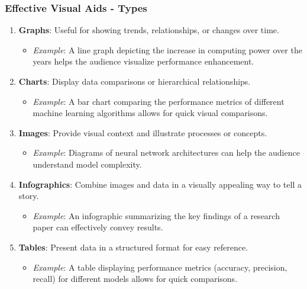 \documentclass[aspectratio=169]{beamer}
\begin{document}
\begin{frame}[fragile]
    \frametitle{Effective Visual Aids - Types}
    \begin{enumerate}
        \item \textbf{Graphs}: Useful for showing trends, relationships, or changes over time.
            \begin{itemize}
                \item \textit{Example}: A line graph depicting the increase in computing power over the years helps the audience visualize performance enhancement.
            \end{itemize}
        \item \textbf{Charts}: Display data comparisons or hierarchical relationships.
            \begin{itemize}
                \item \textit{Example}: A bar chart comparing the performance metrics of different machine learning algorithms allows for quick visual comparisons.
            \end{itemize}
        \item \textbf{Images}: Provide visual context and illustrate processes or concepts.
            \begin{itemize}
                \item \textit{Example}: Diagrams of neural network architectures can help the audience understand model complexity.
            \end{itemize}
        \item \textbf{Infographics}: Combine images and data in a visually appealing way to tell a story.
            \begin{itemize}
                \item \textit{Example}: An infographic summarizing the key findings of a research paper can effectively convey results.
            \end{itemize}
        \item \textbf{Tables}: Present data in a structured format for easy reference.
            \begin{itemize}
                \item \textit{Example}: A table displaying performance metrics (accuracy, precision, recall) for different models allows for quick comparisons.
            \end{itemize}
    \end{enumerate}
\end{frame}
\end{document}

